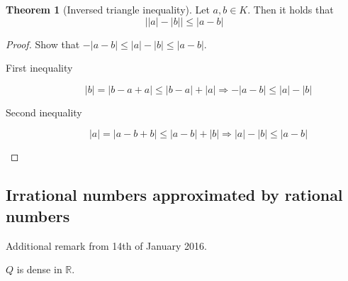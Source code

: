 \documentclass[a4paper,landscape,twocolumn]{article}
\theoremstyle{definition}
\newtheorem{theorem}{Theorem}
\newcommand\abs[1]{\left|#1\right|}
\begin{document}
\begin{theorem}[Inversed triangle inequality]
  Let $a, b \in K$. Then it holds that
  \[ \abs{\abs{a} - \abs{b}} \leq \abs{a - b} \]
\end{theorem}

\begin{proof}
  Show that $-\abs{a - b} \leq \abs{a} - \abs{b} \leq \abs{a - b}$.
  \begin{description}
    \item[First inequality]
      \[ \abs{b} = \abs{b - a + a} \leq \abs{b - a} + \abs{a} \Rightarrow -\abs{a - b} \leq \abs{a} - \abs{b} \]
    \item[Second inequality]
      \[ \abs{a} = \abs{a - b + b} \leq \abs{a - b} + \abs{b} \Rightarrow \abs{a} - \abs{b} \leq \abs{a - b} \]
  \end{description}
\end{proof}

\subsection{Irrational numbers approximated by rational numbers}
%
Additional remark from 14th of January 2016.

$Q$ is dense in $\mathbb R$.
\end{document}
